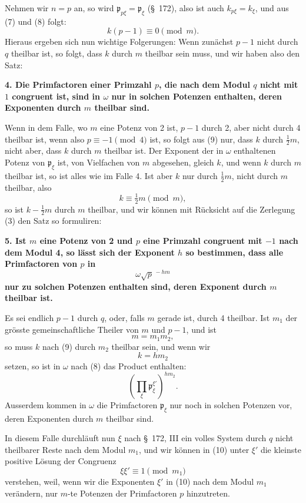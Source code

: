 \documentclass[11pt]{article}
\newcommand{\pp}{\mathfrak p}
\begin{document}
Nehmen wir $n=p$ an, so wird $\pp_{p\xi}=\pp_\xi$ (\S~172), also ist auch $k_{p\xi}=k_\xi$, und aus (7) und (8) folgt:
\begin{equation}
  k(p-1)\equiv0\pmod m.
\tag{9}
\end{equation}
Hieraus ergeben sich nun wichtige Folgerungen: Wenn zunächst $p-1$ nicht durch $q$ theilbar ist, so folgt, dass $k$ durch $m$ theilbar sein muss, und wir haben also den Satz:

\textbf{4. Die Primfactoren einer Primzahl $p$, die nach dem Modul $q$ nicht mit $1$ congruent ist, sind in $\omega$ nur in solchen Potenzen enthalten, deren Exponenten durch $m$ theilbar sind.}

Wenn in dem Falle, wo $m$ eine Potenz von 2 ist, $p-1$ durch 2, aber nicht durch 4 theilbar ist, wenn also $p\equiv-1\pmod4$ ist, so folgt aus (9) nur, dass $k$ durch $\tfrac12m$, nicht aber, dass $k$ durch $m$ theilbar ist. Der Exponent der in $\omega$ enthaltenen Potenz von $\pp_\xi$ ist, von Vielfachen von $m$ abgesehen, gleich $k$, und wenn $k$ durch $m$ theilbar ist, so ist alles wie im Falle 4. Ist aber $k$ nur durch $\tfrac12m$, nicht durch $m$ theilbar, also
\[
  k\equiv\tfrac12m\pmod m,
\]
so ist $k-\tfrac12m$ durch $m$ theilbar, und wir können mit Rücksicht auf die Zerlegung (3) den Satz so formuliren:

\textbf{5. Ist $m$ eine Potenz von 2 und $p$ eine Primzahl congruent mit $-1$ nach dem Modul 4, so lässt sich der Exponent $h$ so bestimmen, dass alle Primfactoren von $p$ in}
\[
  \omega\sqrt p^{\,-hm}
\]
\textbf{nur zu solchen Potenzen enthalten sind, deren Exponent durch $m$ theilbar ist.}

Es sei endlich $p-1$ durch $q$, oder, falls $m$ gerade ist, durch 4 theilbar. Ist $m_1$ der grösste gemeinschaftliche Theiler von $m$ und $p-1$, und ist
\[
  m=m_1m_2,
\]
so muss $k$ nach (9) durch $m_2$ theilbar sein, und wenn wir
\[
  k=hm_2
\]
setzen, so ist in $\omega$ nach (8) das Product enthalten:
\begin{equation}
  \left(\prod_\xi\pp_\xi^{\xi'}\right)^{hm_2}.
\tag{10}
\end{equation}
Ausserdem kommen in $\omega$ die Primfactoren $\pp_\xi$ nur noch in solchen Potenzen vor, deren Exponenten durch $m$ theilbar sind.

In diesem Falle durchläuft nun $\xi$ nach \S~172, III ein volles System durch $q$ nicht theilbarer Reste nach dem Modul $m_1$, und wir können in (10) unter $\xi'$ die kleinste positive Lösung der Congruenz
\[
  \xi\xi'\equiv1\pmod{m_1}
\]
verstehen, weil, wenn wir die Exponenten $\xi'$ in (10) nach dem Modul $m_1$ verändern, nur $m$-te Potenzen der Primfactoren $p$ hinzutreten.
\end{document}
